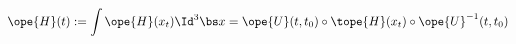 \begin{equation}	\label{12.74}
\ope{H}(t)
:=
\int \ope{H}(x_t) \Id^3\bs x
=
\ope{U}(t,t_0) \circ \tope{H}(x_t)\circ \ope{U}^{-1}(t,t_0)
	\end{equation}

